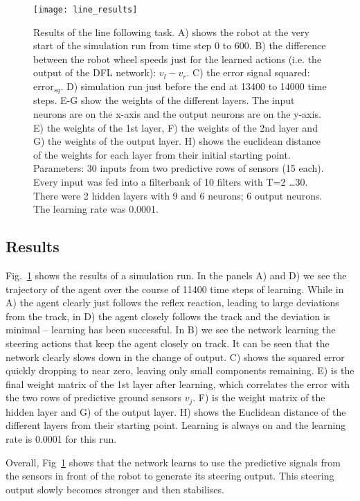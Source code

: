 \documentclass{aamas2018}
\begin{document}
\begin{figure}[!ht]
  \centering
  \texttt{[image: line\_results]}
  \caption{Results of the line following task. A) shows the robot at
    the very start of the simulation run from time step 0 to 600.  B)
    the difference between the robot wheel speeds just for the learned
    actions (i.e. the output of the DFL network): $v_l-v_r$.  C) the
    error signal squared: $\mathrm{error}_{sq}$.  D) simulation run
    just before the end at 13400 to 14000 time steps.  E-G show the
    weights of the different layers. The input neurons are on the
    x-axis and the output neurons are on the y-axis.  E) the weights
    of the 1st layer, F) the weights of the 2nd layer and G) the
    weights of the output layer.  H) shows the euclidean distance of
    the weights for each layer from their initial starting
    point. Parameters: 30 inputs from two predictive rows of sensors
    (15 each). Every input was fed into a filterbank of 10 filters
    with T=2 \ldots 30. There were 2 hidden layers with 9 and 6 neurons; 6 output
    neurons. The learning rate was 0.0001.
    \label{line_results}}
\end{figure}



\subsection{Results}
Fig.~\ref{line_results} shows the results of a simulation run. In the
panels A) and D) we see the trajectory of the agent over the course of
11400 time steps of learning. While in A) the agent clearly just
follows the reflex reaction, leading to large deviations from the
track, in D) the agent closely follows the track and the deviation is
minimal -- learning has been successful. In B) we see the network
learning the steering actions that keep the agent closely on track.
It can be seen that the network clearly slows down in the change of
output.  C) shows the squared error quickly dropping to near zero,
leaving only small components remaining. E) is the final weight matrix
of the 1st layer after learning, which correlates the error with the
two rows of predictive ground sensors $v_j$. F) is the weight matrix
of the hidden layer and G) of the output layer. H) shows the Euclidean
distance of the different layers from their starting point. Learning is always on and the learning rate is 0.0001 for this
run.

Overall, Fig~\ref{line_results} shows that the network learns to use
the predictive signals from the sensors in front of the robot to
generate its steering output. This steering output slowly becomes
stronger and then stabilises.
\end{document}
